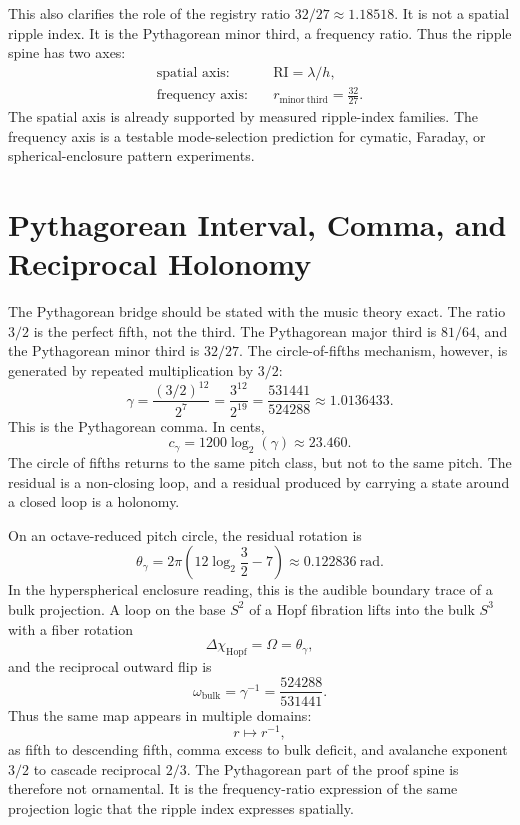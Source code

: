 \documentclass[11pt,a4paper]{article}
\begin{document}
This also clarifies the role of the registry ratio $32/27\approx 1.18518$. It is not a spatial ripple index. It is the Pythagorean minor third, a frequency ratio. Thus the ripple spine has two axes:
\begin{align}
\text{spatial axis:}\quad & \mathrm{RI}=\lambda/h,\\
\text{frequency axis:}\quad & r_{\mathrm{minor\ third}}=\frac{32}{27}.
\end{align}
The spatial axis is already supported by measured ripple-index families. The frequency axis is a testable mode-selection prediction for cymatic, Faraday, or spherical-enclosure pattern experiments.

\section{Pythagorean Interval, Comma, and Reciprocal Holonomy}

The Pythagorean bridge should be stated with the music theory exact. The ratio $3/2$ is the perfect fifth, not the third. The Pythagorean major third is $81/64$, and the Pythagorean minor third is $32/27$. The circle-of-fifths mechanism, however, is generated by repeated multiplication by $3/2$:
\begin{equation}
\gamma
=
\frac{(3/2)^{12}}{2^7}
=
\frac{3^{12}}{2^{19}}
=
\frac{531441}{524288}
\approx 1.0136433.
\label{eq:pythagorean-comma}
\end{equation}
This is the Pythagorean comma. In cents,
\begin{equation}
c_\gamma=1200\log_2(\gamma)\approx 23.460.
\label{eq:comma-cents}
\end{equation}
The circle of fifths returns to the same pitch class, but not to the same pitch. The residual is a non-closing loop, and a residual produced by carrying a state around a closed loop is a holonomy.

On an octave-reduced pitch circle, the residual rotation is
\begin{equation}
\theta_\gamma
=
2\pi\left(12\log_2\frac32-7\right)
\approx 0.122836\ \mathrm{rad}.
\label{eq:comma-angle}
\end{equation}
In the hyperspherical enclosure reading, this is the audible boundary trace of a bulk projection. A loop on the base $S^2$ of a Hopf fibration lifts into the bulk $S^3$ with a fiber rotation
\begin{equation}
\Delta\chi_{\mathrm{Hopf}}=\Omega=\theta_\gamma,
\label{eq:hopf-phase}
\end{equation}
and the reciprocal outward flip is
\begin{equation}
\omega_{\mathrm{bulk}}=\gamma^{-1}=\frac{524288}{531441}.
\label{eq:bulk-reciprocal}
\end{equation}
Thus the same map appears in multiple domains:
\begin{equation}
r\longmapsto r^{-1},
\label{eq:reciprocal-map}
\end{equation}
as fifth to descending fifth, comma excess to bulk deficit, and avalanche exponent $3/2$ to cascade reciprocal $2/3$. The Pythagorean part of the proof spine is therefore not ornamental. It is the frequency-ratio expression of the same projection logic that the ripple index expresses spatially.
\end{document}
